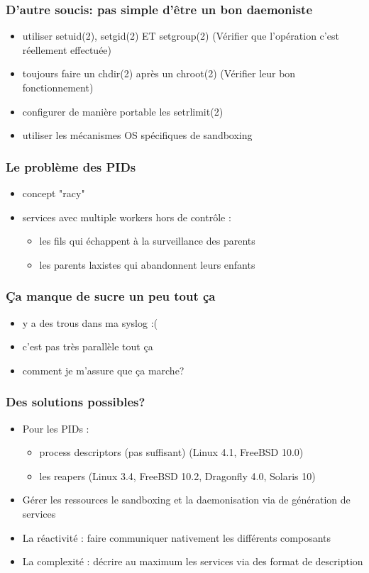\begin{frame}
	\frametitle{D'autre soucis: pas simple d'être un bon daemoniste}
	\begin{itemize}
			\pause
		\item utiliser setuid(2), setgid(2) ET setgroup(2) (Vérifier que l'opération c'est réellement effectuée)
			\pause
		\item toujours faire un chdir(2) après un chroot(2) (Vérifier leur bon fonctionnement)
			\pause
		\item configurer de manière portable les setrlimit(2)
			\pause
		\item utiliser les mécanismes OS spécifiques de sandboxing
	\end{itemize}
\end{frame}

\begin{frame}
	\frametitle{Le problème des PIDs}
	\begin{itemize}
			\pause
		\item concept "racy"
			\pause
		\item services avec multiple workers hors de contrôle :
			\begin{itemize}
				\item les fils qui échappent à la surveillance des parents
				\item les parents laxistes qui abandonnent leurs enfants
			\end{itemize}
	\end{itemize}
\end{frame}

\begin{frame}
	\frametitle{Ça manque de sucre un peu tout ça}
	\begin{itemize}
		\item y a des trous dans ma syslog :(
		\item c'est pas très parallèle tout ça
		\item comment je m'assure que ça marche?
	\end{itemize}
\end{frame}

\begin{frame}
	\frametitle{Des solutions possibles?}
	\begin{itemize}
		\item Pour les PIDs :
			\begin{itemize}
					\pause
				\item process descriptors (pas suffisant) (Linux 4.1, FreeBSD 10.0)
					\pause
				\item les reapers (Linux 3.4, FreeBSD 10.2, Dragonfly 4.0, Solaris 10)
			\end{itemize}
			\pause
		\item Gérer les ressources le sandboxing et la daemonisation via de génération de services
			\pause
		\item La réactivité : faire communiquer nativement les différents composants
			\pause
		\item La complexité : décrire au maximum les services via des format de description
	\end{itemize}
\end{frame}

